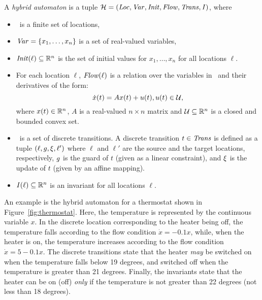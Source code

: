 \begin{definition}\label{def:ha}
A \emph{hybrid automaton} is a tuple $\mathcal{H}=(\mathit{Loc},\mathit{Var},\mathit{Init},\mathit{Flow},\mathit{Trans},\mathit{I})$, where 
\begin{itemize}
\item \loc\ is a finite set of locations,
\item $\mathit{Var}=\{x_1, \dots, x_n\}$ is a set of real-valued variables,
\item $\mathit{Init}(\ell)\subseteq\mathbb{R}^n$ is the set of initial values for $x_1,\dots,x_n$ for all locations $\ell$.
\item For each location $\ell$, $\mathit{Flow}(\ell)$ is a relation over the variables in \var\ and their derivatives of the form:
\[ \dot{x}(t) = Ax(t)+u(t), u(t) \in \mathcal{U}, \]
where $x(t)\in \mathbb{R}^n$, $A$ is a real-valued $n \times n$ matrix and $\mathcal{U} \subseteq \mathbb{R}^n$ is a closed and bounded convex set.
\item \reld\ is a set of discrete transitions. A discrete transition $t\in\mathit{Trans}$ is defined as a tuple $(\ell,g,\xi,\ell')$ where $\ell$ and $\ell'$ are the source and the target locations, respectively, $g$ is the guard of $t$ (given as a linear constraint), and $\xi$ is the update of $t$ (given by an affine mapping).
\item $\mathit{I}(\ell)\subseteq\mathbb{R}^n$ is an invariant for all locations $\ell$. 
\end{itemize}
\end{definition}

An example is the hybrid automaton for a thermostat shown in Figure~\ref{fig:thermostat}. Here, the temperature is represented by the continuous variable $x$. In the discrete location corresponding to the heater being off, the temperature falls according to the flow condition $\dot{x}=-0.1x$, while, when the heater is on, the temperature increases according to the flow condition $\dot{x}=5-0.1x$. The discrete transitions state that the heater \textit{may} be switched on when the temperature falls below 19 degrees, and switched off when the temperature is greater than 21 degrees. Finally, the invariants state that the heater can be on (off) \textit{only} if the temperature is not greater than 22 degrees (not less than 18 degrees).

\begin{figure*}[htb]
\centering

\caption{Thermostat hybrid automaton}
\label{fig:thermostat}
\end{figure*}

